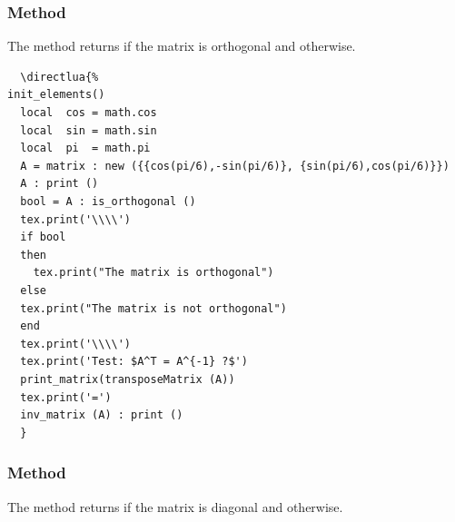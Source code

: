 \subsubsection{Method  } %
\label{ssub:method_is_orthogonal}

The method returns  if the matrix is orthogonal and  otherwise.

\begin{Verbatim}
  \directlua{%
init_elements()
  local  cos = math.cos
  local  sin = math.sin
  local  pi  = math.pi
  A = matrix : new ({{cos(pi/6),-sin(pi/6)}, {sin(pi/6),cos(pi/6)}})
  A : print ()
  bool = A : is_orthogonal ()
  tex.print('\\\\')
  if bool 
  then
    tex.print("The matrix is orthogonal") 
  else 
  tex.print("The matrix is not orthogonal") 
  end
  tex.print('\\\\')
  tex.print('Test: $A^T = A^{-1} ?$')
  print_matrix(transposeMatrix (A))
  tex.print('=')
  inv_matrix (A) : print ()
  }
\end{Verbatim}


\subsubsection{Method } %
\label{ssub:method_is_diagonal}

The method returns  if the matrix is diagonal and  otherwise.



